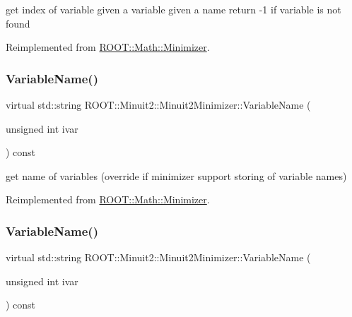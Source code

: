 get index of variable given a variable given a name return -\/1 if variable is not found 

Reimplemented from \mbox{\hyperlink{classROOT_1_1Math_1_1Minimizer_a5f7ff3bdda1f4b1d9e5e1150091a86c5}{R\+O\+O\+T\+::\+Math\+::\+Minimizer}}.

\mbox{\label{classROOT_1_1Minuit2_1_1Minuit2Minimizer_a8f5a6dc65fdfeb0351039d80f7c94968}} 
\subsubsection{\texorpdfstring{VariableName()}{VariableName()}\hspace{0.1cm}{\footnotesize\ttfamily [1/3]}}
{\footnotesize\ttfamily virtual std\+::string R\+O\+O\+T\+::\+Minuit2\+::\+Minuit2\+Minimizer\+::\+Variable\+Name (\begin{DoxyParamCaption}\item[{unsigned int}]{ivar }\end{DoxyParamCaption}) const\hspace{0.3cm}{\ttfamily [virtual]}}



get name of variables (override if minimizer support storing of variable names) 



Reimplemented from \mbox{\hyperlink{classROOT_1_1Math_1_1Minimizer_a4d6a3c9c95608b35a25f16afd50690ad}{R\+O\+O\+T\+::\+Math\+::\+Minimizer}}.

\mbox{\label{classROOT_1_1Minuit2_1_1Minuit2Minimizer_a8f5a6dc65fdfeb0351039d80f7c94968}} 
\subsubsection{\texorpdfstring{VariableName()}{VariableName()}\hspace{0.1cm}{\footnotesize\ttfamily [2/3]}}
{\footnotesize\ttfamily virtual std\+::string R\+O\+O\+T\+::\+Minuit2\+::\+Minuit2\+Minimizer\+::\+Variable\+Name (\begin{DoxyParamCaption}\item[{unsigned int}]{ivar }\end{DoxyParamCaption}) const\hspace{0.3cm}{\ttfamily [virtual]}}



